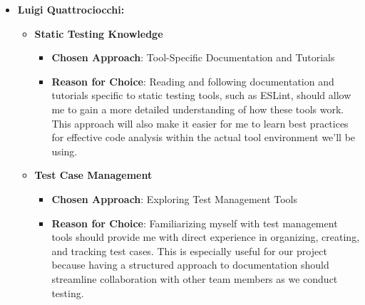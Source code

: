 \documentclass[12pt, titlepage]{article}
\begin{document}
\begin{enumerate}
\begin{itemize}
\begin{itemize}
    \end{itemize}
    \item \textbf{Luigi Quattrociocchi:}
    \begin{itemize}
        \item \textbf{Static Testing Knowledge}
        \begin{itemize}
            \item \textbf{Chosen Approach}: Tool-Specific Documentation and Tutorials
            \item \textbf{Reason for Choice}: Reading and following documentation and tutorials specific to static testing tools, such as ESLint, should allow me to gain a more detailed understanding of how these tools work. This approach will also make it easier for me to learn best practices for effective code analysis within the actual tool environment we'll be using.
        \end{itemize}
        
        \item \textbf{Test Case Management}
        \begin{itemize}
            \item \textbf{Chosen Approach}: Exploring Test Management Tools
            \item \textbf{Reason for Choice}: Familiarizing myself with test management tools should provide me with direct experience in organizing, creating, and tracking test cases. This is especially useful for our project because having a structured approach to documentation should streamline collaboration with other team members as we conduct testing.
        \end{itemize}
    \end{itemize}

\end{itemize}
\end{enumerate}
\end{document}
